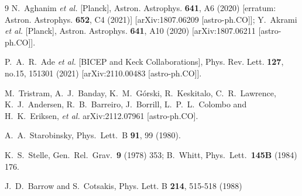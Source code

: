 \documentclass[aps,prev,twocolumn,preprintnumbers,floatfix,nofootinbib]{revtex4-1}
\begin{document}
\begin{thebibliography}{9}
N.~Aghanim \textit{et al.} [Planck],
Astron. Astrophys. \textbf{641}, A6 (2020)
[erratum: Astron. Astrophys. \textbf{652}, C4 (2021)]
[arXiv:1807.06209 [astro-ph.CO]];
Y.~Akrami \textit{et al.} [Planck],
Astron. Astrophys. \textbf{641}, A10 (2020)
[arXiv:1807.06211 [astro-ph.CO]].

P.~A.~R.~Ade \textit{et al.} [BICEP and Keck Collaborations],
Phys. Rev. Lett. \textbf{127}, no.15, 151301 (2021)
[arXiv:2110.00483 [astro-ph.CO]].



M.~Tristram, A.~J.~Banday, K.~M.~G\'orski, R.~Keskitalo, C.~R.~Lawrence, K.~J.~Andersen, R.~B.~Barreiro, J.~Borrill, L.~P.~L.~Colombo and H.~K.~Eriksen, \textit{et al.}
arXiv:2112.07961 [astro-ph.CO].


A.~A.~Starobinsky,
Phys.\ Lett.\ B {\bf 91}, 99 (1980).

K.~S.~Stelle,
  Gen.\ Rel.\ Grav.\  {\bf 9} (1978) 353;
  B.~Whitt,
  Phys.\ Lett.\  {\bf 145B} (1984) 176.

J.~D.~Barrow and S.~Cotsakis,
Phys. Lett. B \textbf{214}, 515-518 (1988)


\end{thebibliography}
\end{document}

